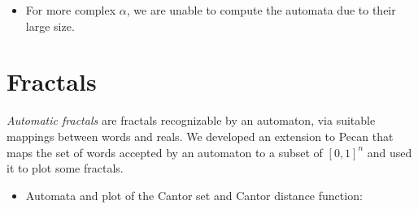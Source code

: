 \documentclass[landscape,usenames,dvipsnames, 25pt]{sciposter}
\begin{document}
\begin{multicols}{3}
\begin{itemize}
    \item For more complex $\alpha$, we are unable to compute the automata due to their large size.
\end{itemize}

\columnbreak

\section*{Fractals}

\emph{Automatic fractals} are fractals recognizable by an automaton, via  suitable mappings between words and reals. 
We developed an extension to Pecan that maps the set of words accepted by an automaton to a subset of $[0, 1]^n$ and used it to plot some fractals.

\begin{itemize}
    \item Automata and plot of the Cantor set and Cantor distance function:
\end{itemize}


\end{multicols}
\end{document}
